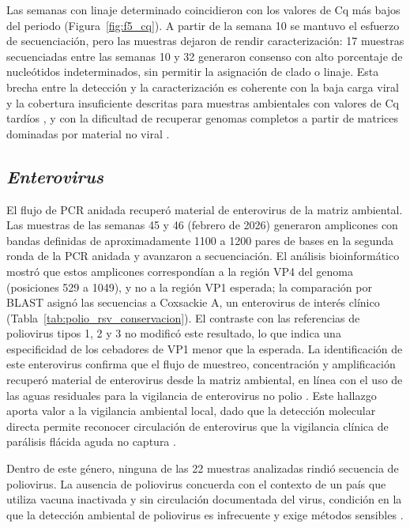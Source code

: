 Las semanas con linaje determinado coincidieron con los valores de Cq más bajos del periodo (Figura~\ref{fig:f5_cq}). A partir de la semana 10 se mantuvo el esfuerzo de secuenciación, pero las muestras dejaron de rendir caracterización: 17 muestras secuenciadas entre las semanas 10 y 32 generaron consenso con alto porcentaje de nucleótidos indeterminados, sin permitir la asignación de clado o linaje. Esta brecha entre la detección y la caracterización es coherente con la baja carga viral y la cobertura insuficiente descritas para muestras ambientales con valores de Cq tardíos \cite{MejiaCalle_2024,Parkins_2023}, y con la dificultad de recuperar genomas completos a partir de matrices dominadas por material no viral \cite{Child_2023}.

\subsection{\textit{Enterovirus}}

El flujo de PCR anidada recuperó material de enterovirus de la matriz ambiental. Las muestras de las semanas 45 y 46 (febrero de 2026) generaron amplicones con bandas definidas de aproximadamente 1100 a 1200 pares de bases en la segunda ronda de la PCR anidada y avanzaron a secuenciación. El análisis bioinformático mostró que estos amplicones correspondían a la región VP4 del genoma (posiciones 529 a 1049), y no a la región VP1 esperada; la comparación por BLAST asignó las secuencias a Coxsackie A, un enterovirus de interés clínico (Tabla~\ref{tab:polio_rsv_conservacion}). El contraste con las referencias de poliovirus tipos 1, 2 y 3 no modificó este resultado, lo que indica una especificidad de los cebadores de VP1 menor que la esperada. La identificación de este enterovirus confirma que el flujo de muestreo, concentración y amplificación recuperó material de enterovirus desde la matriz ambiental, en línea con el uso de las aguas residuales para la vigilancia de enterovirus no polio \cite{Bubba_2023}. Este hallazgo aporta valor a la vigilancia ambiental local, dado que la detección molecular directa permite reconocer circulación de enterovirus que la vigilancia clínica de parálisis flácida aguda no captura \cite{Asghar_2014,Bottcher_2025}.

Dentro de este género, ninguna de las 22 muestras analizadas rindió secuencia de poliovirus. La ausencia de poliovirus concuerda con el contexto de un país que utiliza vacuna inactivada y sin circulación documentada del virus, condición en la que la detección ambiental de poliovirus es infrecuente y exige métodos sensibles \cite{Zurbriggen_2008,Asghar_2014}.

